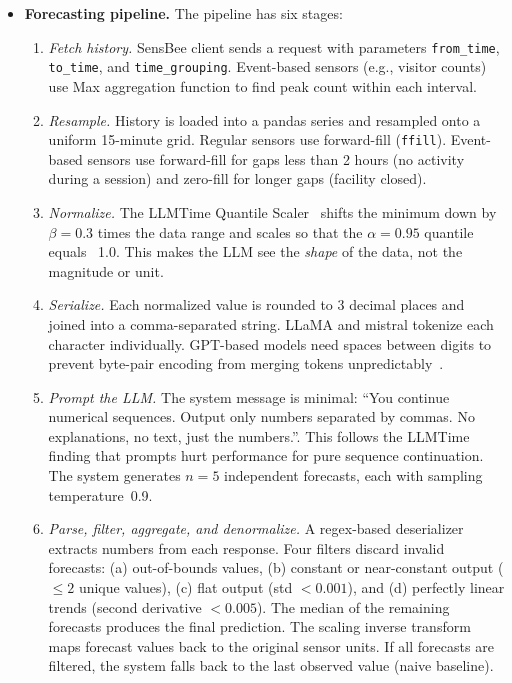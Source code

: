 \documentclass[11pt,a4paper]{article}
\begin{document}
\begin{itemize}[leftmargin=*]
\item \textbf{Forecasting pipeline.}
The pipeline has six stages:
\begin{enumerate}[leftmargin=2em]
  \item \textit{Fetch history.} SensBee client sends a request with parameters \texttt{from\_time}, \texttt{to\_time}, and \texttt{time\_grouping}. Event-based sensors (e.g., visitor counts) use Max aggregation function to find peak count within each interval.
  \item \textit{Resample.} 
  History is loaded into a pandas series and resampled onto a uniform 15-minute grid. Regular sensors use forward-fill (\texttt{ffill}). Event-based sensors use forward-fill for gaps less than 2 hours (no activity during a session) and zero-fill for longer gaps (facility closed).
  \item \textit{Normalize.} The LLMTime Quantile Scaler~\cite{gruver2023llmtime} shifts the minimum down by $\beta = 0.3$ times the data range and scales so that the $\alpha = 0.95$ quantile equals ~1.0. This makes the LLM see the \emph{shape} of the data, not the magnitude or unit.
  \item \textit{Serialize.} Each normalized value is rounded to 3 decimal places and joined into a comma-separated string. LLaMA and mistral tokenize each character individually. GPT-based models need spaces between digits to prevent byte-pair encoding from merging tokens unpredictably~\cite{gruver2023llmtime}.
  \item \textit{Prompt the LLM.} 
  The system message is minimal: “You continue numerical sequences. Output only numbers separated by commas. No explanations, no text, just the numbers.”. This follows the LLMTime finding that prompts hurt performance for pure sequence continuation. The system generates $n = 5$ independent forecasts, each with sampling temperature~0.9.
  \item \textit{Parse, filter, aggregate, and denormalize.} A regex-based deserializer extracts numbers from each response. Four filters discard invalid forecasts: (a) out-of-bounds values, (b) constant or near-constant output ($\le 2$ unique values), (c) flat output (std $< 0.001$), and (d) perfectly linear trends (second derivative $< 0.005$). The median of the remaining forecasts produces the final prediction. The scaling inverse transform maps forecast values back to the original sensor units. If all forecasts are filtered, the system falls back to the last observed value (naive baseline).
\end{enumerate}


\end{itemize}
\end{document}
